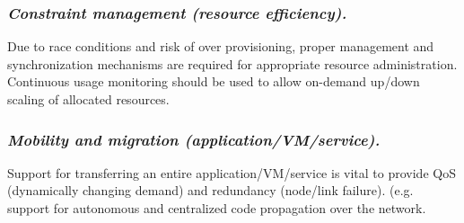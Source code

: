 	\subsubsection{ \textbf{\emph{Constraint management (resource efficiency).}} }Due to race conditions and risk of over provisioning, proper management and synchronization mechanisms are required for appropriate resource administration. Continuous usage monitoring should be used to allow on-demand up/down scaling of allocated resources.
	
	\subsubsection{ \textbf{\emph{Mobility and migration (application/VM/service).}}} Support for transferring an entire application/VM/service is vital to provide QoS (dynamically changing demand) and redundancy (node/link failure). (e.g. support for autonomous and centralized code propagation over the network.
